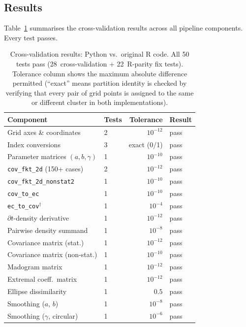 \documentclass[a4paper]{elsarticle}
\begin{document}
\subsection{Results}

Table~\ref{tab:verification} summarises the cross-validation results
across all pipeline components.  Every test passes.

\begin{table}[ht]
\caption{Cross-validation results: Python vs.\ original R code.
  All 50 tests pass (28~cross-validation + 22~R-parity fix tests).
  Tolerance column shows the maximum absolute
  difference permitted (``exact'' means partition identity is checked
  by verifying that every pair of grid points is assigned to the
  same or different cluster in both implementations).}
\label{tab:verification}
\centering
\footnotesize
\begin{tabular}{@{}p{3.6cm}lrl@{}}
\toprule
\textbf{Component} & \textbf{Tests} & \textbf{Tolerance} & \textbf{Result} \\
\midrule
Grid axes \& coordinates     & 2  & $10^{-12}$ & pass \\
Index conversions             & 3  & exact (0/1)& pass \\
Parameter matrices $(a,b,\gamma)$ & 1 & $10^{-10}$ & pass \\
\texttt{cov\_fkt\_2d} (150+ cases)& 2 & $10^{-12}$ & pass \\
\texttt{cov\_fkt\_2d\_nonstat2}   & 1 & $10^{-10}$ & pass \\
\texttt{cov\_to\_ec}              & 1 & $10^{-10}$ & pass \\
\texttt{ec\_to\_cov}$^{\dagger}$  & 1 & $10^{-4}$  & pass \\
$\partial t$-density derivative   & 1 & $10^{-12}$ & pass \\
Pairwise density summand      & 1  & $10^{-8}$  & pass \\
Covariance matrix (stat.)     & 1  & $10^{-12}$ & pass \\
Covariance matrix (non-stat.) & 1  & $10^{-10}$ & pass \\
Madogram matrix               & 1  & $10^{-12}$ & pass \\
Extremal coeff.\ matrix       & 1  & $10^{-12}$ & pass \\
Ellipse dissimilarity         & 1  & $0.5$      & pass \\
Smoothing ($a$, $b$)          & 1  & $10^{-8}$  & pass \\
Smoothing ($\gamma$, circular)& 1  & $10^{-6}$  & pass \\

\end{tabular}
\end{table}
\end{document}
